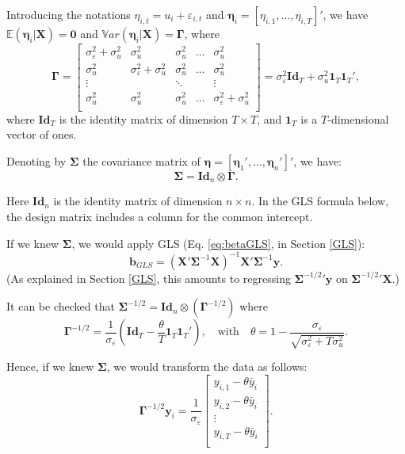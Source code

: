 \documentclass[
  11pt,
]{book}
\theoremstyle{definition}
\theoremstyle{definition}
\theoremstyle{definition}
\theoremstyle{definition}
\theoremstyle{remark}
\begin{document}
Introducing the notations \(\eta_{i,t} = u_i + \varepsilon_{i,t}\) and \(\boldsymbol\eta_i = [\eta_{i,1},\dots,\eta_{i,T}]'\), we have \(\mathbb{E}(\boldsymbol\eta_i |\mathbf{X}) = \mathbf{0}\) and \(\mathbb{V}ar(\boldsymbol\eta_i | \mathbf{X}) = \boldsymbol\Gamma\), where
\[
\boldsymbol\Gamma = \left[  \begin{array}{ccccc}
\sigma_\varepsilon^2+\sigma_u^2 & \sigma_u^2 & \sigma_u^2 & \dots & \sigma_u^2\\
\sigma_u^2 & \sigma_\varepsilon^2+\sigma_u^2 & \sigma_u^2 & \dots & \sigma_u^2\\
\vdots && \ddots && \vdots \\
\sigma_u^2 & \sigma_u^2 & \sigma_u^2 & \dots & \sigma_\varepsilon^2+\sigma_u^2\\
\end{array}
\right] = \sigma_\varepsilon^2\mathbf{Id}_T + \sigma_u^2\mathbf{1}_T\mathbf{1}_T',
\]
where \(\mathbf{Id}_T\) is the identity matrix of dimension \(T \times T\), and \(\mathbf{1}_T\) is a \(T\)-dimensional vector of ones.

Denoting by \(\boldsymbol\Sigma\) the covariance matrix of \(\boldsymbol\eta = [\boldsymbol\eta_1',\dots,\boldsymbol\eta_n']'\), we have:
\[
\boldsymbol\Sigma = \mathbf{Id}_n \otimes \boldsymbol\Gamma.
\]

Here \(\mathbf{Id}_n\) is the identity matrix of dimension \(n \times n\). In the GLS formula below, the design matrix includes a column for the common intercept.

If we knew \(\boldsymbol\Sigma\), we would apply GLS (Eq. \eqref{eq:betaGLS}, in Section \ref{GLS}):
\[
\mathbf{b}_{GLS} = (\mathbf{X}'\boldsymbol\Sigma^{-1}\mathbf{X})^{-1}\mathbf{X}'\boldsymbol\Sigma^{-1}\mathbf{y}.
\]
(As explained in Section \ref{GLS}, this amounts to regressing \({\boldsymbol\Sigma^{-1/2}}'\mathbf{y}\) on \({\boldsymbol\Sigma^{-1/2}}'\mathbf{X}\).)

It can be checked that \(\boldsymbol\Sigma^{-1/2} = \mathbf{Id}_n \otimes (\boldsymbol\Gamma^{-1/2})\) where
\[
\boldsymbol\Gamma^{-1/2} = \frac{1}{\sigma_\varepsilon}\left( \mathbf{Id}_T - \frac{\theta}{T}\mathbf{1}_T\mathbf{1}_T'\right),\quad \mbox{with}\quad\theta = 1 - \frac{\sigma_\varepsilon}{\sqrt{\sigma_\varepsilon^2+T\sigma_u^2}}.
\]

Hence, if we knew \(\boldsymbol\Sigma\), we would transform the data as follows:
\[
\boldsymbol\Gamma^{-1/2}\mathbf{y}_i = \frac{1}{\sigma_\varepsilon}\left[\begin{array}{c}y_{i,1} - \theta\bar{y}_i\\y_{i,2} - \theta\bar{y}_i\\\vdots\\y_{i,T} - \theta\bar{y}_i\\\end{array}\right].
\]
\end{document}
